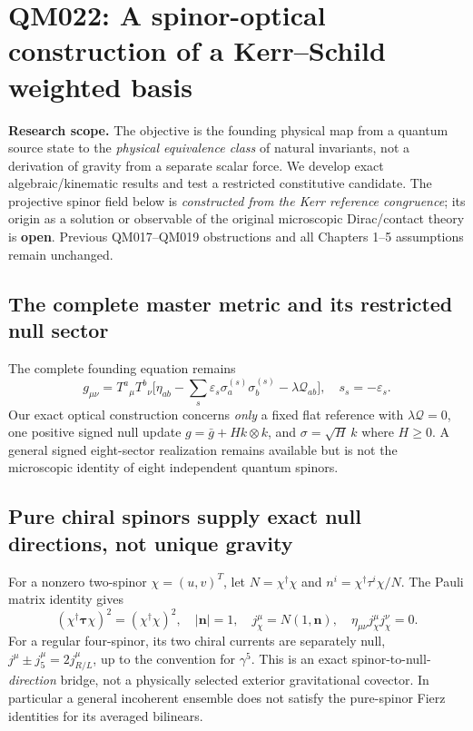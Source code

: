 \documentclass[11pt,a4paper]{article}
\begin{document}
\section{QM022: A spinor-optical construction of a Kerr--Schild weighted basis}\label{sec:v12-qm022}
\textbf{Research scope.} The objective is the founding physical map from a quantum source state to the \emph{physical equivalence class} of natural invariants, not a derivation of gravity from a separate scalar force. We develop exact algebraic/kinematic results and test a restricted constitutive candidate. The projective spinor field below is \emph{constructed from the Kerr reference congruence}; its origin as a solution or observable of the original microscopic Dirac/contact theory is \textbf{open}. Previous QM017--QM019 obstructions and all Chapters 1--5 assumptions remain unchanged.

\subsection{The complete master metric and its restricted null sector}
The complete founding equation remains
\begin{equation}\label{eq:v12-master}
\boxed{g_{\mu\nu}=T^a{}_{\mu}T^b{}_{\nu}
\big[\eta_{ab}-\sum_s\varepsilon_s\sigma_a^{(s)}\sigma_b^{(s)}-\lambda\mathcal Q_{ab}\big],\quad s_s=-\varepsilon_s.}
\end{equation}
Our exact optical construction concerns \emph{only} a fixed flat reference with $\lambda\mathcal Q=0$, one positive signed null update $g=\bar g+Hk\otimes k$, and $\sigma=\sqrt H\,k$ where $H\ge0$. A general signed eight-sector realization remains available but is not the microscopic identity of eight independent quantum spinors.

\subsection{Pure chiral spinors supply exact null directions, not unique gravity}
For a nonzero two-spinor $\chi=(u,v)^T$, let $N=\chi^\dagger\chi$ and $n^i=\chi^\dagger\tau^i\chi/N$. The Pauli matrix identity gives
\begin{equation}\label{eq:v12-Pauli}
(\chi^\dagger\boldsymbol\tau\chi)^2=(\chi^\dagger\chi)^2,
\quad |\boldsymbol n|=1,\quad
j_\chi^\mu=N(1,\boldsymbol n),\quad \eta_{\mu\nu}j_\chi^\mu j_\chi^\nu=0.
\end{equation}
For a regular four-spinor, its two chiral currents are separately null, $j^\mu\pm j_5^\mu=2j^\mu_{R/L}$, up to the convention for $\gamma^5$. This is an exact spinor-to-null-\emph{direction} bridge, not a physically selected exterior gravitational covector. In particular a general incoherent ensemble does not satisfy the pure-spinor Fierz identities for its averaged bilinears.
\end{document}
